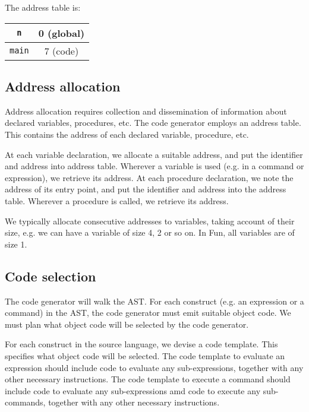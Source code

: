 \documentclass[a4paper, openany]{memoir}
\begin{document}
The address table is:
\begin{table}[H]
    \centering
    \begin{tabular}{|c|c|}
        \hline
        \texttt{n} & 0 (global) \\
        \hline
        \texttt{main} & 7 (code) \\
        \hline
    \end{tabular}
\end{table}

\subsection{Address allocation}
Address allocation requires collection and dissemination of information about declared variables, procedures, etc. The code generator employs an address table. This contains the address of each declared variable, procedure, etc.

At each variable declaration, we allocate a suitable address, and put the identifier and address into address table. Wherever a variable is used (e.g. in a command or expression), we retrieve its address. At each procedure declaration, we note the address of its entry point, and put the identifier and address into the address table. Wherever a procedure is called, we retrieve its address.

We typically allocate consecutive addresses to variables, taking account of their size, e.g. we can have a variable of size 4, 2 or so on. In Fun, all variables are of size 1.

\subsection{Code selection}
The code generator will walk the AST. For each construct (e.g. an expression or a command) in the AST, the code generator must emit suitable object code. We must plan what object code will be selected by the code generator.

For each construct in the source language, we devise a code template. This specifies what object code will be selected. The code template to evaluate an expression should include code to evaluate any sub-expressions, together with any other necessary instructions. The code template to execute a command should include code to evaluate any sub-expressions amd code to execute any sub-commands, together with any other necessary instructions.
\end{document}

